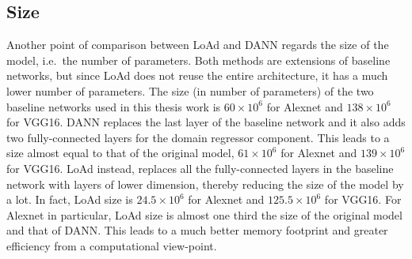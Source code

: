 \documentclass[../main.tex]{subfiles}
\begin{document}
    \subsection{Size}
	Another point of comparison between LoAd and DANN regards the size of the model, i.e.\ the number of parameters. Both methods
	are extensions of baseline networks, but since LoAd does not reuse the entire architecture, it has a much lower number of parameters.
	The size (in number of parameters) of the two baseline networks used in this thesis work is $60 \times 10^{6}$ for Alexnet and $138 \times 10^{6}$ for
	VGG16. DANN replaces the last layer of the baseline network and it also adds two fully-connected layers for the domain
    regressor component. This leads to a size almost equal to that of the original model, $61 \times 10^{6}$ for Alexnet and $139 \times 10^{6}$ for VGG16.
    LoAd instead, replaces all the fully-connected layers in the baseline network with layers of lower dimension, thereby reducing
    the size of the model by a lot. In fact, LoAd size is $24.5 \times 10^{6}$ for Alexnet and $125.5 \times 10^{6}$ for VGG16. For Alexnet in particular,
    LoAd size is almost one third the size of the original model and that of DANN\@. This leads to a much better memory footprint
    and greater efficiency from a computational view-point.
\end{document}
